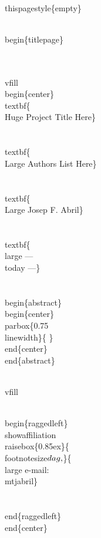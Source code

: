 \documentclass[11pt]{article}
\begin{document}
\nwenddocs{}\endmoddef
\\thispagestyle\{empty\}

\\begin\{titlepage\}

\\ \\vfill
\\begin\{center\}
\\textbf\{\\Huge Project Title Here\}\\\\[5ex]

\\textbf\{\\Large Authors List Here\}\\\\[1ex]
\\textbf\{\\Large Josep F. Abril\}\\\\[5ex] %

\\textbf\{\\large --- \\today ---\}\\\\[10ex]

\\begin\{abstract\}
\\begin\{center\}
\\parbox\{0.75\\linewidth\}\{
\} %
\\end\{center\}
\\end\{abstract\}

\\vfill

\\begin\{raggedleft\}
\\showaffiliation
\\raisebox\{0.85ex\}\{\\footnotesize$\\dag\\,$\}\{\\large e-mail: \\mtjabril\}\\\\
\\end\{raggedleft\}
\\end\{center\}
\end{document}

